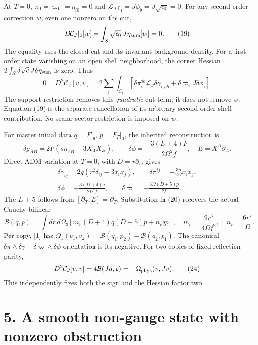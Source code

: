 \documentclass[
  10pt,
]{article}
\begin{document}
At \(T=0\), \(\pi_0=\varpi_0=\eta_{i0}=0\) and
\(\mathcal L_J\gamma_0=J\phi_0=J\sqrt{c_0}=0\). For any second-order
correction \(w\), even one nonzero on the cut, \[
 D\mathcal C_J|_0[w]
 =\int_S\sqrt{c_0}\,J\eta_{\rm sum}[w]=0 .              \tag{19}
\] The equality uses the closed cut and its invariant background
density. For a first-order state vanishing on an open shell
neighborhood, the corner Hessian
\(2\int_S\delta\sqrt c\,J\delta\eta_{\rm sum}\) is zero. Thus \[
 0=D^2\mathcal C_J[v,v]
 =2\sum_i\int_{C_i}
  [\delta\pi_i^{ab}\mathcal L_J\delta\gamma_{i,ab}
                       +\delta\varpi_iJ\delta\phi_i].   \tag{20}
\] The support restriction removes this \emph{quadratic} cut term; it
does not remove \(w\). Equation (19) is the separate cancellation of its
arbitrary second-order shell contribution. No scalar-sector restriction
is imposed on \(w\).

For master initial data \(q=F|_0\), \(p=F_T|_0\), the inherited
reconstruction is \[
 \delta g_{AB}=2F(s\eta_{AB}-3X_AX_B),\qquad
 \delta\phi=-\frac{3(E+4)F}{2\Omega^2f},\quad E=X^A\partial_A.
                                                               \tag{21}
\] Direct ADM variation at \(T=0\), with \(D=r\partial_r\), gives \[
 \begin{gathered}
 \delta\gamma_{ij}=2q(r^2\delta_{ij}-3x_ix_j),\qquad
 \delta\pi^{ij}=-\frac{3p}{2\Omega}x_ix_j,\\
 \delta\phi=-\frac{3(D+4)q}{2\Omega^2f},\qquad
 \delta\varpi=-\frac{3\Omega(D+5)p}{2f}.
 \end{gathered}                                           \tag{22}
\] The \(D+5\) follows from \([\partial_T,E]=\partial_T\). Substitution
in (20) recovers the actual Cauchy bilinear \[
 \mathcal B(q,p)=\int dr\,d\Omega_3
 [m_r(D+4)q(D+5)p+n_rqp],\quad
 m_r=\frac{9r^3}{4\Omega f^2},\quad n_r=\frac{6r^7}{\Omega}.\tag{23}
\] Per copy, {[}1{]} has
\(\Omega_1(v_1,v_2)=\mathcal B(q_1,p_2)-\mathcal B(q_2,p_1)\). The
canonical \(\delta\pi\wedge\delta\gamma+\delta\varpi\wedge\delta\phi\)
orientation is its negative. For two copies of fixed reflection parity,
\[
 D^2\mathcal C_J[v,v]=4\mathcal B(Jq,p)
                    =-\Omega_{\rm phys}(v,Jv).          \tag{24}
\] This independently fixes both the sign and the Hessian factor two.

\section{5. A smooth non-gauge state with nonzero
obstruction}\label{a-smooth-non-gauge-state-with-nonzero-obstruction}
\end{document}
